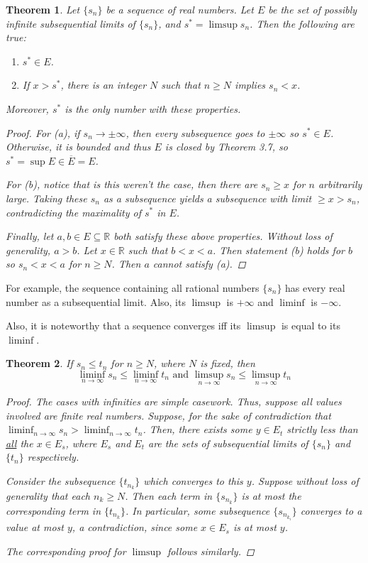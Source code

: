 \documentclass{scrbook}
\newcommand{\R}{\mathbb{R}}
\renewcommand{\to}{\rightarrow}
\renewcommand{\underline}{\ul}
\newtheorem{theorem}{Theorem}
\begin{document}
\begin{theorem} %
Let $\{s_n\}$ be a sequence of real numbers. Let $E$ be the set of possibly infinite subsequential limits of $\{s_n\}$, and $s^* = \limsup s_n$. Then the following are true:

\begin{enumerate}
\item $s^* \in E$.
\item If $x > s^*$, there is an integer $N$ such that $n \ge N$ implies $s_n < x$. 
\end{enumerate}
Moreover, $s^*$ is the only number with these properties.

\begin{proof}
For (a), if $s_n \to \pm \infty$, then every subsequence goes to $\pm \infty$ so $s^* \in E$. Otherwise, it is bounded and thus $E$ is closed by Theorem 3.7, so $s^* = \sup E \in \overline{E} = E$. 

For (b), notice that is this weren't the case, then there are $s_n \ge x$ for $n$ arbitrarily large. Taking these $s_n$ as a subsequence yields a subsequence with limit $\ge x > s_n$, contradicting the maximality of $s^*$ in $E$.

Finally, let $a, b \in E \subseteq \R$ both satisfy these above properties. Without loss of generality, $a > b$. Let $x \in \R$ such that $b < x < a$. Then statement (b) holds for $b$ so $s_n < x < a$ for $n \ge N$. Then $a$ cannot satisfy (a).
\end{proof}
\end{theorem}

For example, the sequence containing all rational numbers $\{s_n\}$ has every real number as a subsequential limit. Also, its $\limsup$ is $+\infty$ and $\liminf$ is $-\infty$.

Also, it is noteworthy that a sequence converges iff its $\limsup$ is equal to its $\liminf$. 

\begin{theorem} %
If $s_n \le t_n$ for $n \ge N$, where $N$ is fixed, then
\[
	\liminf_{n \to \infty} s_n \le \liminf_{n \to \infty} t_n \text{ and } \limsup_{n \to \infty} s_n \le \limsup_{n \to \infty} t_n
\]

\begin{proof}
The cases with infinities are simple casework. Thus, suppose all values involved are finite real numbers. Suppose, for the sake of contradiction that $\liminf_{n \to \infty} s_n > \liminf_{n \to \infty} t_n$. Then, there exists some $y \in E_t$ strictly less than \underline{all} the $x \in E_s$, where $E_s$ and $E_t$ are the sets of subsequential limits of $\{s_n\}$ and $\{t_n\}$ respectively. 

Consider the subsequence $\{t_{n_k}\}$ which converges to this $y$. Suppose without loss of generality that each $n_k \ge N$. Then each term in $\{s_{n_k}\}$ is at most the corresponding term in $\{t_{n_k}\}$. In particular, some subsequence $\{s_{n_{k_i}}\}$ converges to a value at most $y$, a contradiction, since some $x \in E_s$ is at most $y$.

The corresponding proof for $\limsup$ follows similarly.
\end{proof}
\end{theorem}
\end{document}

